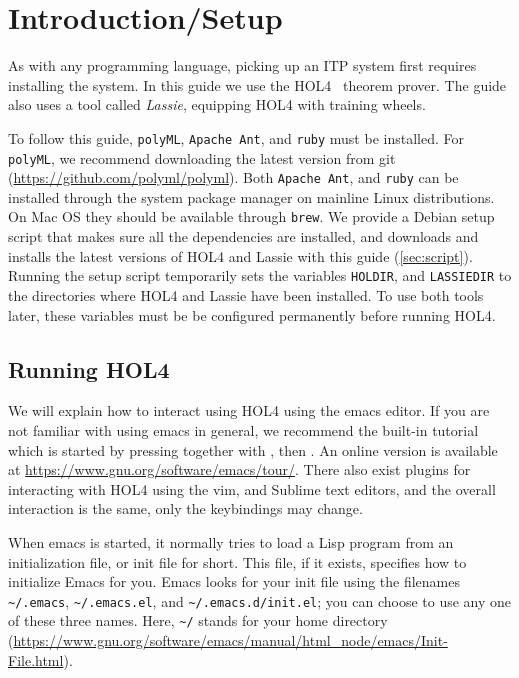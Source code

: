 \section{Introduction/Setup}
%
As with any programming language, picking up an ITP system first requires
installing the system.
In this guide we use the HOL4~\cite{HOL4web} theorem prover.
The guide also uses a tool called \emph{Lassie}, equipping HOL4 with training
wheels.

To follow this guide, \texttt{polyML}, \texttt{Apache Ant}, and \texttt{ruby}
must be installed.
For \texttt{polyML}, we recommend downloading the latest version from git
(\url{https://github.com/polyml/polyml}).
Both \texttt{Apache Ant}, and \texttt{ruby} can be installed through the system
package manager on mainline Linux distributions.
On Mac OS they should be available through \texttt{brew}.
We provide a Debian setup script that makes sure all the dependencies are
installed,
and downloads and installs the latest versions of HOL4 and Lassie with this
guide (\autoref{sec:script}).
Running the setup script temporarily sets the variables \texttt{HOLDIR}, and
\texttt{LASSIEDIR} to the directories where HOL4 and Lassie have been installed.
To use both tools later, these variables must be be configured permanently
before running HOL4.

\subsection{Running HOL4}

We will explain how to interact using HOL4 using the emacs editor.
If you are not familiar with using emacs in general, we recommend the
built-in tutorial which is started by pressing  together with
, then . An online version is available at
\url{https://www.gnu.org/software/emacs/tour/}.
There also exist plugins for interacting with HOL4 using the vim, and Sublime
text editors, and the overall interaction is the same, only the keybindings may
change.

When emacs is started, it normally tries to load a Lisp program from an
initialization file, or init file for short. This file, if it exists, specifies
how to initialize Emacs for you. Emacs looks for your init file using the
filenames \verb!~/.emacs!, \verb!~/.emacs.el!, and
\verb!~/.emacs.d/init.el!; you can choose to use any one of these three names.
Here, \verb!~/! stands for your home directory
(\url{https://www.gnu.org/software/emacs/manual/html_node/emacs/Init-File.html}).

